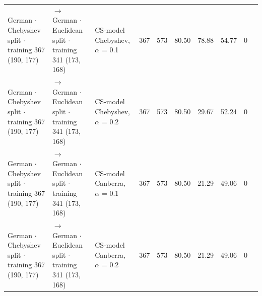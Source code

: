 \begin{table}[htbp]
\begin{tabular}{lllrrrrrrl}
    German $\cdot$ Chebyshev split $\cdot$ training 367 (190, 177) & $\to$ German $\cdot$ Euclidean split $\cdot$ training 341 (173, 168) & CS-model Chebyshev, $\alpha$ = 0.1 & 367 & 573 & 80.50 & 78.88 & 54.77 & 0 &  \\
    German $\cdot$ Chebyshev split $\cdot$ training 367 (190, 177) & $\to$ German $\cdot$ Euclidean split $\cdot$ training 341 (173, 168) & CS-model Chebyshev, $\alpha$ = 0.2 & 367 & 573 & 80.50 & 29.67 & 52.24 & 0 &  \\
    German $\cdot$ Chebyshev split $\cdot$ training 367 (190, 177) & $\to$ German $\cdot$ Euclidean split $\cdot$ training 341 (173, 168) & CS-model Canberra, $\alpha$ = 0.1 & 367 & 573 & 80.50 & 21.29 & 49.06 & 0 &  \\
    German $\cdot$ Chebyshev split $\cdot$ training 367 (190, 177) & $\to$ German $\cdot$ Euclidean split $\cdot$ training 341 (173, 168) & CS-model Canberra, $\alpha$ = 0.2 & 367 & 573 & 80.50 & 21.29 & 49.06 & 0 &  \\
    \bottomrule
  \end{tabular}
\end{table}
